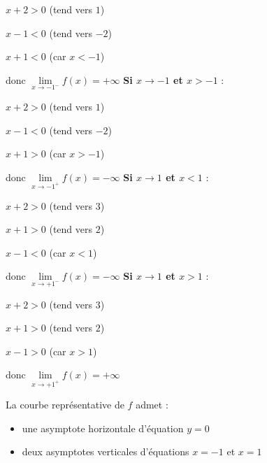 \begin{corrige}
\begin{enumerate}
          $x+2 > 0$ (tend vers $1$)
          \par
          $x-1 < 0$ (tend vers $-2$)
          \par
          $x+1 < 0$ (car $x < -1$)
          \par
          donc $\lim\limits_{x\rightarrow -1^-}f\left(x\right)=+\infty $
\medskip
          \textbf{Si $x\rightarrow -1$ et $x > -1$} :
          \par
          $x+2 > 0$ (tend vers $1$)
          \par
          $x-1 < 0$ (tend vers $-2$)
          \par
          $x+1 > 0$ (car $x > -1$)
          \par
          donc $\lim\limits_{x\rightarrow -1^+}f\left(x\right)=-\infty $
\medskip
          \textbf{Si $x\rightarrow 1$ et $x < 1$} :
          \par
          $x+2 > 0$ (tend vers $3$)
          \par
          $x+1 > 0$ (tend vers $2$)
          \par
          $x-1 < 0$ (car $x < 1$)
          \par
          donc $\lim\limits_{x\rightarrow +1^-}f\left(x\right)=-\infty $
\medskip
          \textbf{Si $x\rightarrow 1$ et $x > 1$} :
          \par
          $x+2 > 0$ (tend vers $3$)
          \par
          $x+1 > 0$ (tend vers $2$)
          \par
          $x-1 > 0$ (car $x > 1$)
          \par
          donc $\lim\limits_{x\rightarrow +1^+}f\left(x\right)=+\infty $
     \end{enumerate}
     La courbe représentative de $f$ admet :
     \begin{itemize}
          \item
          une asymptote horizontale d'équation $y=0$
          \item
          deux asymptotes verticales d'équations $x=-1$ et $x=1$
     \end{itemize}
\begin{center}
 \begin{extern}%

\end{extern}
\end{center}
\end{corrige}
